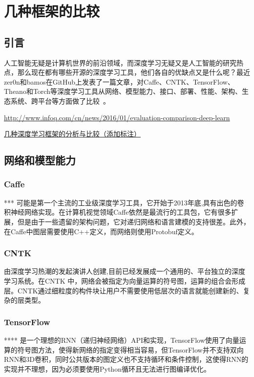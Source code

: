 \chapter{几种框架的比较}
\section{引言}
人工智能无疑是计算机世界的前沿领域，而深度学习无疑又是人工智能的研究热点，那么现在都有哪些开源的深度学习工具，他们各自的优缺点又是什么呢？最近zer0n和bamos在GitHub上发表了一篇文章，对Caffe、CNTK、TensorFlow、Theano和Torch等深度学习工具从网络、模型能力、接口、部署、性能、架构、生态系统、跨平台等方面做了比较~\cite{深度学习框架的评估与比较_孙镜涛}。

\url{http://www.infoq.com/cn/news/2016/01/evaluation-comparison-deep-learn}%

\href{http://blog.csdn.net/liccv/article/details/52526506}{几种深度学习框架的分析与比较（添加标注）}%


\section{网络和模型能力}
\subsection{Caffe}
***
可能是第一个主流的工业级深度学习工具，它开始于2013年底,具有出色的卷积神经网络实现。在计算机视觉领域Caffe依然是最流行的工具包，它有很多扩展，但是由于一些遗留的架构问题，它对递归网络和语言建模的支持很差。此外，在Caffe中图层需要使用C++定义，而网络则使用Protobuf定义。

\subsection{CNTK}
由深度学习热潮的发起演讲人创建,目前已经发展成一个通用的、平台独立的深度学习系统。在CNTK 中，网络会被指定为向量运算的符号图，运算的组合会形成层。CNTK通过细粒度的构件块让用户不需要使用低层次的语言就能创建新的、复杂的层类型。

\subsection{TensorFlow}
****
是一个理想的RNN（递归神经网络）API和实现，TensorFlow使用了向量运算的符号图方法，使得新网络的指定变得相当容易，但TensorFlow并不支持双向RNN和3D卷积，同时公共版本的图定义也不支持循环和条件控制，这使得RNN的实现并不理想，因为必须要使用Python循环且无法进行图编译优化。

